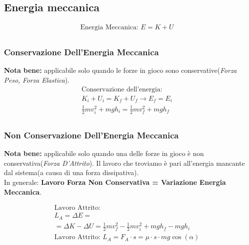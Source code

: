 \subsection{Energia meccanica}

\begin{gather*}
    \text{Energia Meccanica: } E = K + U \\
\end{gather*}
\subsubsection{Conservazione Dell'Energia Meccanica}
\textbf{Nota bene: } applicabile solo quando le forze in gioco sono conservative(\textit{Forza Peso, Forza Elastica}).
\begin{gather*}
    \text{Conservazione dell'energia: } \\ K_i + U_i = K_f + U_f \rightarrow E_f = E_i \\ \frac{1}{2} m v_i^2 + mgh_i = \frac{1}{2} mv_f^2 + mgh_f \\
\end{gather*}

\subsubsection{Non Conservazione Dell'Energia Meccanica}

\textbf{Nota bene: } applicabile solo quando una delle forze in gioco è non conservativa(\textit{Forza D'Attrito}). Il lavoro che troviamo è pari all'energia mancante dal sistema(a causa di una forza dissipativa). \\
In generale: \textbf{Lavoro Forza Non Conservativa = Variazione Energia Meccanica}.

\begin{gather*}
    \text{Lavoro Attrito: } \\ L_A = \Delta E = \\ = \Delta K - \Delta U = \frac{1}{2} m v_f^2 - \frac{1}{2} m v_i^2 + mgh_f - mgh_i \\
    \text{Lavoro Attrito: } L_A = F_{A} \cdot s = \mu \cdot s \cdot m g \cos (\alpha)
\end{gather*}